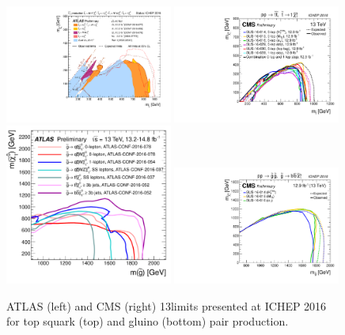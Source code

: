 \begin{figure}[!htb] \centering
\includegraphics[width=0.49\textwidth]{figs/summary/ATLAS_SUSY_Stop_tLSP.pdf}
\includegraphics[width=0.49\textwidth]{figs/summary/T2tt_limits_summary_cms_ICHEP16.pdf}\\
\includegraphics[width=0.49\textwidth]{figs/summary/ATLAS_SUSY_Strong_all.pdf}
\includegraphics[width=0.49\textwidth]{figs/summary/T1bbbb_limits_summary_cms_ICHEP16.pdf}
\caption{ATLAS (left) and CMS (right) 13\TeV limits presented
  at ICHEP 2016 for top squark (top) and gluino (bottom) pair production.
\label{fig:ICHEP2016Summary}}
\end{figure}
